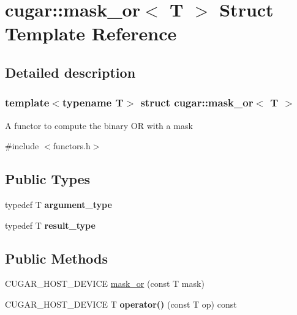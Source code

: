 \hypertarget{structcugar_1_1mask__or}{}\section{cugar\+:\+:mask\+\_\+or$<$ T $>$ Struct Template Reference}
\label{structcugar_1_1mask__or}


\subsection{Detailed description}
\subsubsection*{template$<$typename T$>$\newline
struct cugar\+::mask\+\_\+or$<$ T $>$}

A functor to compute the binary OR with a mask 

{\ttfamily \#include $<$functors.\+h$>$}

\subsection*{Public Types}
\begin{DoxyCompactItemize}
\item 
\mbox{\label{structcugar_1_1mask__or_ac6db4c2d6b1d6e6ecabc36431a146473}} 
typedef T {\bfseries argument\+\_\+type}
\item 
\mbox{\label{structcugar_1_1mask__or_a32215a052404b23fca17fb56d9894968}} 
typedef T {\bfseries result\+\_\+type}
\end{DoxyCompactItemize}
\subsection*{Public Methods}
\begin{DoxyCompactItemize}
\item 
C\+U\+G\+A\+R\+\_\+\+H\+O\+S\+T\+\_\+\+D\+E\+V\+I\+CE \hyperlink{structcugar_1_1mask__or_a8c26498aac9e53fada9437c828f4ff20}{mask\+\_\+or} (const T mask)
\item 
\mbox{\label{structcugar_1_1mask__or_a459b111ab7a4a67ee21c255695151547}} 
C\+U\+G\+A\+R\+\_\+\+H\+O\+S\+T\+\_\+\+D\+E\+V\+I\+CE T {\bfseries operator()} (const T op) const
\end{DoxyCompactItemize}


